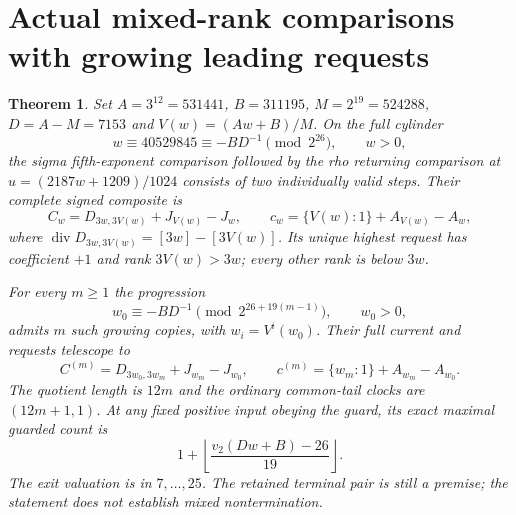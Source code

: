 \documentclass[11pt]{article}
\newtheorem{theorem}{Theorem}
\begin{document}
\section{Actual mixed-rank comparisons with growing leading requests}
\begin{theorem}\label{thm:mixedgrowth}
Set $A=3^{12}=531441$, $B=311195$, $M=2^{19}=524288$,
$D=A-M=7153$ and $V(w)=(Aw+B)/M$. On the full cylinder
\[
 w\equiv40529845\equiv-BD^{-1}\pmod{2^{26}},\qquad w>0,
\]
the sigma fifth-exponent comparison followed by the rho returning
comparison at $u=(2187w+1209)/1024$ consists of two individually valid
steps. Their complete signed composite is
\[
 C_w=D_{3w,3V(w)}+J_{V(w)}-J_w,\qquad
 c_w=\{V(w):1\}+A_{V(w)}-A_w,
\]
where $\operatorname{div}D_{3w,3V(w)}=[3w]-[3V(w)]$.
Its unique highest request has coefficient $+1$ and rank
$3V(w)>3w$; every other rank is below $3w$.

For every $m\ge1$ the progression
\[
 w_0\equiv-BD^{-1}\pmod{2^{26+19(m-1)}},\qquad w_0>0,
\]
admits $m$ such growing copies, with $w_i=V^i(w_0)$. Their full current
and requests telescope to
\[
 C^{(m)}=D_{3w_0,3w_m}+J_{w_m}-J_{w_0},\qquad
 c^{(m)}=\{w_m:1\}+A_{w_m}-A_{w_0}.
\]
The quotient length is $12m$ and the ordinary common-tail clocks are
$(12m+1,1)$. At any fixed positive input obeying the guard, its exact
maximal guarded count is
\[
 1+\left\lfloor\frac{v_2(Dw+B)-26}{19}\right\rfloor.
\]
The exit valuation is in $7,\ldots,25$. The retained terminal pair is
still a premise; the statement does not establish mixed nontermination.
\end{theorem}
\end{document}
